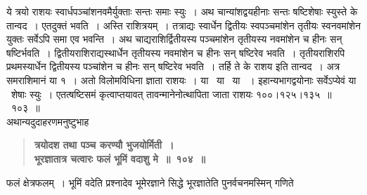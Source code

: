 \documentclass[11pt, openany]{book}
\begin{document}
\begin{sloppypar}
ये त्रयो राशयः स्वार्धपञ्चांशनवमैर्युक्ताः सन्तः समाः स्युः~। अथ चान्यांशद्वयहीनाः सन्तः षष्टिशेषाः स्युस्ते के तान्वद~। एतदुक्तं भवति~। अस्ति राशित्रयम्~। तत्राद्यः स्वार्धेन द्वितीयः स्वपञ्चमांशेन तृतीयः स्वनवमांशेन युक्तः सर्वेऽपि समा एव भवन्ति~। अथ चाद्यराशिर्द्वितीयस्य पञ्चमांशेन तृतीयस्य नवमांशेन च हीनः सन् षष्टिर्भवति~। द्वितीयराशिराद्यस्थार्धेन तृतीयस्य नवमांशेन च हीनः सन् षष्टिरेव भवति~। तृतीयराशिरपि प्रथमस्यार्धेन द्वितीयस्य पञ्चांशेन च हीनः सन् षष्टिरेव भवति~। तर्हि ते के राशय इति तान्वद~। अत्र समराशिमानं या १~। अतो विलोमविधिना ज्ञाता राशयः~। या \, या \, या ~। इहान्यभागद्वयोनाः सर्वेऽप्येवं या \, शेषाः स्युः~। एतत्षष्टिसमं कृत्वाप्तयावत् तावन्मानेनोत्थापिता जाता राशयः १००।१२५।१३५~॥~१०३~॥\\

{\small अथान्यदुदाहरणमनुष्टुभाह\textendash }

 \label{7.104}
\begin{quote}
{\large \textbf{{\color{purple}त्रयोदश तथा पञ्च करण्यौ भुजयोर्मिती~।\\
भूरज्ञातात्र चत्वारः फलं भूमिं वदाशु मे~॥~१०४~॥}}}
\end{quote}

फलं क्षेत्रफलम्~। भूमिं वदेति प्रश्नादेव भूमेरज्ञाने सिद्धे भूरज्ञातेति पुनर्वचनमस्मिन् गणिते
\end{sloppypar}
\end{document}
